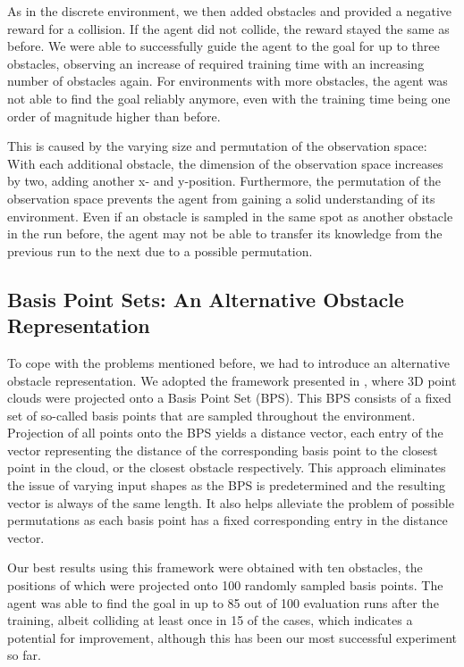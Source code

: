 \documentclass[conference]{IEEEtran}
\begin{document}
As in the discrete environment, we then added obstacles and provided a negative reward for a collision. If the agent did not collide, the reward stayed the same as before. We were able to successfully guide the agent to the goal for up to three obstacles, observing an increase of required training time with an increasing number of obstacles again. For environments with more obstacles, the agent was not able to find the goal reliably anymore, even with the training time being one order of magnitude higher than before.

This is caused by the varying size and permutation of the observation space: With each additional obstacle, the dimension of the observation space increases by two, adding another x- and y-position. Furthermore, the permutation of the observation space prevents the agent from gaining a solid understanding of its environment. Even if an obstacle is sampled in the same spot as another obstacle in the run before, the agent may not be able to transfer its knowledge from the previous run to the next due to a possible permutation.

\subsection{Basis Point Sets: An Alternative Obstacle Representation}

To cope with the problems mentioned before, we had to introduce an alternative obstacle representation. We adopted the framework presented in \cite{b2}, where 3D point clouds were projected onto a Basis Point Set (BPS). This BPS consists of a fixed set of so-called basis points that are sampled throughout the environment. Projection of all points onto the BPS yields a distance vector, each entry of the vector representing the distance of the corresponding basis point to the closest point in the cloud, or the closest obstacle respectively. This approach eliminates the issue of varying input shapes as the BPS is predetermined and the resulting vector is always of the same length. It also helps alleviate the problem of possible permutations as each basis point has a fixed corresponding entry in the distance vector.
 
Our best results using this framework were obtained with ten obstacles, the positions of which were projected onto 100 randomly sampled basis points. The agent was able to find the goal in up to 85 out of 100 evaluation runs after the training, albeit colliding at least once in 15 of the cases, which indicates a potential for improvement, although this has been our most successful experiment so far.
\end{document}
